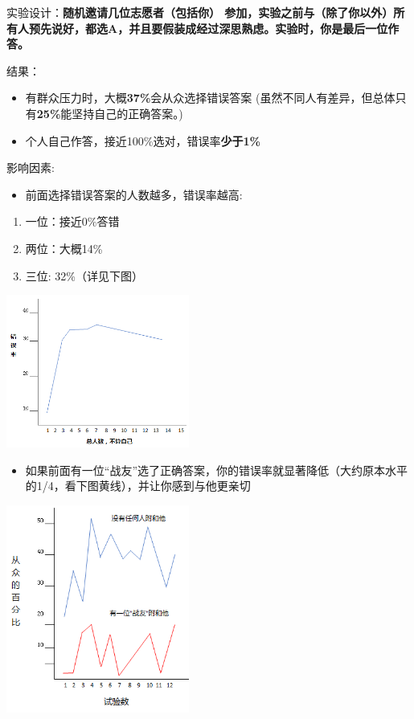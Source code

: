 实验设计：\textbf{随机邀请几位志愿者（包括你）
参加，实验之前与（除了你以外）所有人预先说好，都选A，并且要假装成经过深思熟虑。实验时，你是最后一位作答。}

结果：

\begin{itemize}
\tightlist
\item
  有群众压力时，大概\textbf{37\%}会从众选择错误答案
  (虽然不同人有差异，但总体只有\textbf{25\%}能坚持自己的正确答案。)
\item
  个人自己作答，接近100\%选对，错误率\textbf{少于1\%}
\end{itemize}

影响因素:

\begin{itemize}
\tightlist
\item
  前面选择错误答案的人数越多，错误率越高:
\end{itemize}

\begin{enumerate}
\tightlist
\item
  一位：接近0\%答错
\item
  两位：大概14\%
\item
  三位: 32\%（详见下图）
\end{enumerate}

\includegraphics[width=6cm]{Asch3Screenshot_2022-07-08_2013411.png}

\begin{itemize}
\tightlist
\item
  如果前面有一位``战友''选了正确答案，你的错误率就显著降低（大约原本水平的1/4，看下图黄线），并让你感到与他更亲切
\end{itemize}

\includegraphics[width=6cm]{Asch4Screenshot_2022-07-08_2015021.png}

